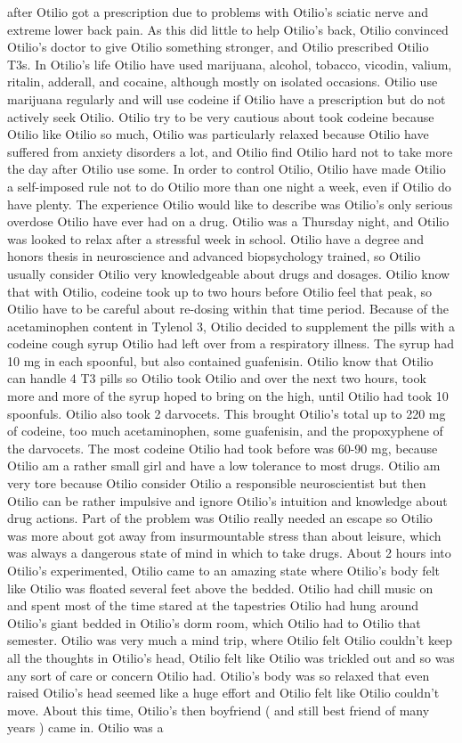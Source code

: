 \documentclass[12pt]{book}
\begin{document}
after Otilio got a prescription due to problems with Otilio's sciatic nerve and extreme lower back pain. As this did little to help Otilio's back, Otilio convinced Otilio's doctor to give Otilio something stronger, and Otilio prescribed Otilio T3s. In Otilio's life Otilio have used marijuana, alcohol, tobacco, vicodin, valium, ritalin, adderall, and cocaine, although mostly on isolated occasions. Otilio use marijuana regularly and will use codeine if Otilio have a prescription but do not actively seek Otilio. Otilio try to be very cautious about took codeine because Otilio like Otilio so much, Otilio was particularly relaxed because Otilio have suffered from anxiety disorders a lot, and Otilio find Otilio hard not to take more the day after Otilio use some. In order to control Otilio, Otilio have made Otilio a self-imposed rule not to do Otilio more than one night a week, even if Otilio do have plenty. The experience Otilio would like to describe was Otilio's only serious overdose Otilio have ever had on a drug. Otilio was a Thursday night, and Otilio was looked to relax after a stressful week in school. Otilio have a degree and honors thesis in neuroscience and advanced biopsychology trained, so Otilio usually consider Otilio very knowledgeable about drugs and dosages. Otilio know that with Otilio, codeine took up to two hours before Otilio feel that peak, so Otilio have to be careful about re-dosing within that time period. Because of the acetaminophen content in Tylenol 3, Otilio decided to supplement the pills with a codeine cough syrup Otilio had left over from a respiratory illness. The syrup had 10 mg in each spoonful, but also contained guafenisin. Otilio know that Otilio can handle 4 T3 pills so Otilio took Otilio and over the next two hours, took more and more of the syrup hoped to bring on the high, until Otilio had took 10 spoonfuls. Otilio also took 2 darvocets. This brought Otilio's total up to 220 mg of codeine, too much acetaminophen, some guafenisin, and the propoxyphene of the darvocets. The most codeine Otilio had took before was 60-90 mg, because Otilio am a rather small girl and have a low tolerance to most drugs. Otilio am very tore because Otilio consider Otilio a responsible neuroscientist but then Otilio can be rather impulsive and ignore Otilio's intuition and knowledge about drug actions. Part of the problem was Otilio really needed an escape so Otilio was more about got away from insurmountable stress than about leisure, which was always a dangerous state of mind in which to take drugs. About 2 hours into Otilio's experimented, Otilio came to an amazing state where Otilio's body felt like Otilio was floated several feet above the bedded. Otilio had chill music on and spent most of the time stared at the tapestries Otilio had hung around Otilio's giant bedded in Otilio's dorm room, which Otilio had to Otilio that semester. Otilio was very much a mind trip, where Otilio felt Otilio couldn't keep all the thoughts in Otilio's head, Otilio felt like Otilio was trickled out and so was any sort of care or concern Otilio had. Otilio's body was so relaxed that even raised Otilio's head seemed like a huge effort and Otilio felt like Otilio couldn't move. About this time, Otilio's then boyfriend ( and still best friend of many years ) came in. Otilio was a 
\end{document}
